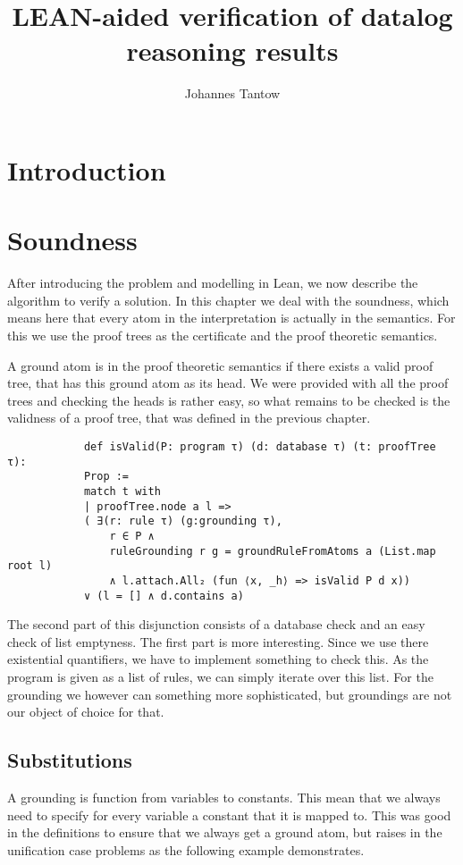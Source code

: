 \documentclass{article}
\title{LEAN-aided verification of datalog reasoning results}
\author{Johannes Tantow}
\begin{document}
    \maketitle
    \section{Introduction}
    
    

    \section{Soundness}
        After introducing the problem and modelling in Lean, we now describe the algorithm to verify a solution. In this chapter we deal with the soundness, which means here that every atom in the interpretation is actually in the semantics. For this we use the proof trees as the certificate and the proof theoretic semantics.

        A ground atom is in the proof theoretic semantics if there exists a valid proof tree, that has this ground atom as its head. We were provided with all the proof trees and checking the heads is rather easy, so what remains to be checked is the validness of a proof tree, that was defined in the previous chapter.

        \begin{lstlisting}
            def isValid(P: program τ) (d: database τ) (t: proofTree τ): 
            Prop :=
            match t with
            | proofTree.node a l => 
            ( ∃(r: rule τ) (g:grounding τ), 
                r ∈ P ∧ 
                ruleGrounding r g = groundRuleFromAtoms a (List.map root l)
                ∧ l.attach.All₂ (fun ⟨x, _h⟩ => isValid P d x)) 
            ∨ (l = [] ∧ d.contains a)
        \end{lstlisting}

        The second part of this disjunction consists of a database check and an easy check of list emptyness. The first part is more interesting. Since we use there existential quantifiers, we have to implement something to check this. As the program is given as a list of rules, we can simply iterate over this list. For the grounding we however can something more sophisticated, but groundings are not our object of choice for that.

        
        \subsection{Substitutions}
            A grounding is function from variables to constants. This mean that we always need to specify for every variable a constant that it is mapped to. This was good in the definitions to ensure that we always get a ground atom, but raises in the unification case problems as the following example demonstrates.
\end{document}
